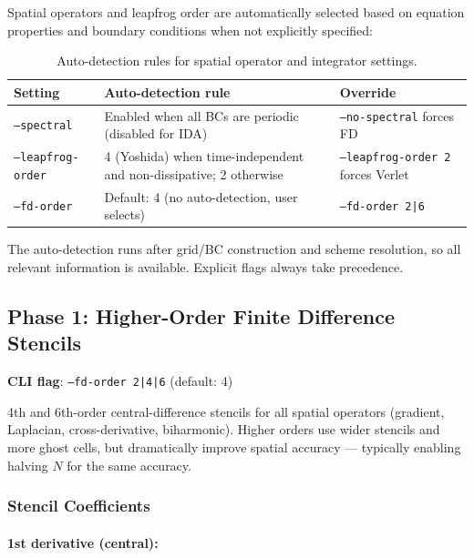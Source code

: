 Spatial operators and leapfrog order are automatically selected based on
equation properties and boundary conditions when not explicitly specified:

\begin{table}[htbp]
\centering
\caption{Auto-detection rules for spatial operator and integrator settings.}
\label{tab:auto-detection}
\begin{tabular}{@{}lll@{}}
\toprule
Setting & Auto-detection rule & Override \\
\midrule
\texttt{--spectral} & Enabled when all BCs are periodic (disabled for IDA) & \texttt{--no-spectral} forces FD \\
\texttt{--leapfrog-order} & 4 (Yoshida) when time-independent and non-dissipative; 2 otherwise & \texttt{--leapfrog-order 2} forces Verlet \\
\texttt{--fd-order} & Default: 4 (no auto-detection, user selects) & \texttt{--fd-order 2|6} \\
\bottomrule
\end{tabular}
\end{table}

The auto-detection runs after grid/BC construction and scheme resolution, so
all relevant information is available. Explicit flags always take precedence.

\subsection{Phase 1: Higher-Order Finite Difference Stencils}
\label{sec:fd-stencils}

\textbf{CLI flag}: \texttt{--fd-order 2|4|6} (default: 4)

4th and 6th-order central-difference stencils for all spatial operators
(gradient, Laplacian, cross-derivative, biharmonic). Higher orders use
wider stencils and more ghost cells, but dramatically improve spatial
accuracy --- typically enabling halving $N$ for the same accuracy.

\subsubsection{Stencil Coefficients}
\label{sec:stencil-coefficients}

\paragraph{1st derivative (central):}
\label{par:grad-stencils}

